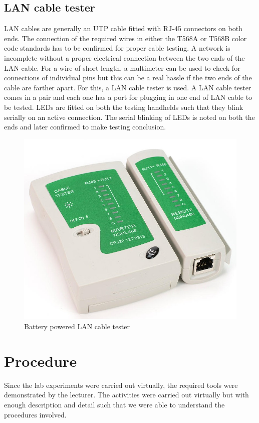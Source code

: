 \documentclass{lab_sheet}
\begin{document}
\subsection{LAN cable tester}
LAN cables are generally an UTP cable fitted with RJ-45 connectors on both ends. The connection of the required wires in either the T568A or T568B color code standards has to be confirmed for proper cable testing. A network is incomplete without a proper electrical connection between the two ends of the LAN cable. For a wire of short length, a multimeter can be used to check for connections of individual pins but this can be a real hassle if the two ends of the cable are farther apart. For this, a LAN cable tester is used. A LAN cable tester comes in a pair and each one has a port for plugging in one end of LAN cable to be tested. LEDs are fitted on both the testing handhelds such that they blink serially on an active connection. The serial blinking of LEDs is noted on both the ends and later confirmed to make testing conclusion.
\begin{figure}[H]
    \centering
    \includegraphics[scale=0.3]{Figures/tester.jpg}
    \caption{Battery powered LAN cable tester}
    \label{fig:tester}
\end{figure}
\section{Procedure}
Since the lab experiments were carried out virtually, the required tools were demonstrated by the lecturer. The activities were carried out virtually but with enough description and detail such that we were able to understand the procedures involved.
\end{document}
